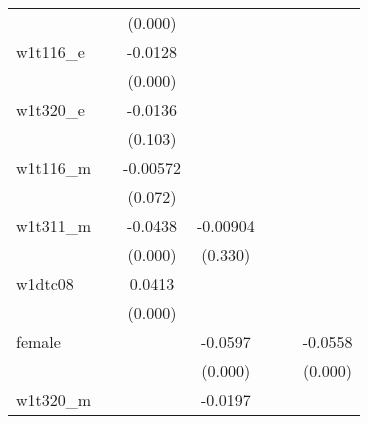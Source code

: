 {\begin{tabular}{l*{6}{c}}
            &                     &     (0.000)         &                     &                     &                     &                     \\
[1em]
w1t116\_e    &                     &     -0.0128\sym{***}&                     &                     &                     &                     \\
            &                     &     (0.000)         &                     &                     &                     &                     \\
[1em]
w1t320\_e    &                     &     -0.0136         &                     &                     &                     &                     \\
            &                     &     (0.103)         &                     &                     &                     &                     \\
[1em]
w1t116\_m    &                     &    -0.00572\sym{*}  &                     &                     &                     &                     \\
            &                     &     (0.072)         &                     &                     &                     &                     \\
[1em]
w1t311\_m    &                     &     -0.0438\sym{***}&    -0.00904         &                     &                     &                     \\
            &                     &     (0.000)         &     (0.330)         &                     &                     &                     \\
[1em]
w1dtc08     &                     &      0.0413\sym{***}&                     &                     &                     &                     \\
            &                     &     (0.000)         &                     &                     &                     &                     \\
[1em]
female      &                     &                     &     -0.0597\sym{***}&                     &                     &     -0.0558\sym{***}\\
            &                     &                     &     (0.000)         &                     &                     &     (0.000)         \\
[1em]
w1t320\_m    &                     &                     &     -0.0197\sym{***}&                     &                     &                     \\

\end{tabular}}
